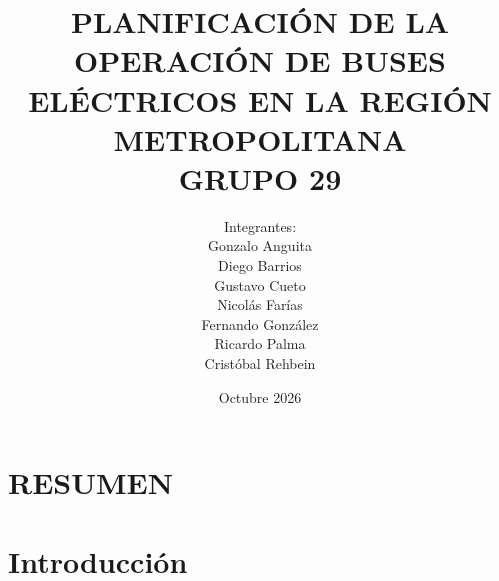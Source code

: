\documentclass[pdftex,spanish]{pucthesis}	%
\begin{document}

\title[PLANIFICACIÓN DE LA OPERACIÓN DE BUSES ELÉCTRICOS EN LA REGIÓN METROPOLITANA\\ GRUPO 29]
   {\bf PLANIFICACIÓN DE LA OPERACIÓN DE BUSES ELÉCTRICOS EN LA REGIÓN METROPOLITANA\\ GRUPO 29}
\author[Integrantes:]{Integrantes:\\
\textnormal{\small{
Gonzalo Anguita\\
Diego Barrios\\
Gustavo Cueto\\
Nicolás Farías\\
Fernando González\\
Ricardo Palma\\
Cristóbal Rehbein}
}
}

\address{Escuela de Ingenier\'ia\\
                   Pontificia Universidad Cat\'olica de Chile\\
                   Vicu\~na Mackenna 4860\\
                  Santiago, Chile\\
                  {\it Tel.\/} : 56 (2) 354-2000}

\date                       {Octubre 2026}

\NoChapterPageNumber
{}
\maketitle

\tableofcontents
{} \label{listoffigures}
\listoffigures
{} \label{listoftables}
\listoftables
\cleardoublepage

 \label{resumen}
\chapter*{RESUMEN}

\cleardoublepage


\chapter[INTRODUCCIÓN]{Introducción} \label{ch:introduccion}

\end{document}
